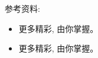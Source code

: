 \documentclass[a4paper, justified]{tufte-handout}
\begin{document}
\begin{solution}
\end{solution}

\beginoptional

\begin{problem}[]
\end{problem}

\begin{solution}
\end{solution}

\beginot

\begin{ot}[]

  \noindent 参考资料:
  \begin{itemize}
    \item 更多精彩, 由你掌握。
  \end{itemize}
\end{ot}

\vspace{0.50cm}
\begin{ot}[]
  \begin{itemize}
    \item 更多精彩, 由你掌握。
  \end{itemize}
\end{ot}




\beginfb



\end{document}
